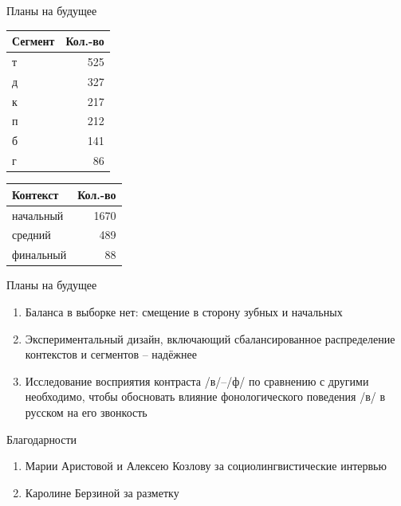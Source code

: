 \documentclass[10 pt, handout]{beamer}
\begin{document}
\begin{frame}{Планы на будущее}

\centering
\begin{tabular}{lr}
\toprule
\textbf{Сегмент} &  \textbf{Кол.-во} \\
\midrule
т       &    525 \\
д       &    327 \\
к       &    217 \\
п       &    212 \\
б       &    141 \\
г       &     86 \\
\bottomrule
\end{tabular}

\vfill

\begin{tabular}{lr}
\toprule
\textbf{Контекст} &  \textbf{Кол.-во} \\
\midrule
начальный &     1670 \\
средний  &      489 \\
финальный   &       88 \\
\bottomrule
\end{tabular}

\end{frame}

\begin{frame}{Планы на будущее}

	\begin{enumerate}[$\gg$]
		\item Баланса в выборке нет: смещение в сторону зубных и начальных
		\item Экспериментальный дизайн, включающий сбалансированное распределение контекстов и сегментов -- надёжнее
		\item Исследование восприятия контраста /в/--/ф/ по сравнению с другими необходимо, чтобы обосновать влияние фонологического поведения /в/ в русском на его звонкость %
	\end{enumerate}

\end{frame}

\begin{frame}{Благодарности}

				\begin{enumerate}[\ding{170}]
					\item Марии Аристовой и Алексею Козлову за социолингвистические интервью
					\item Каролине Берзиной за разметку
				\end{enumerate}

\end{frame}
\end{document}
